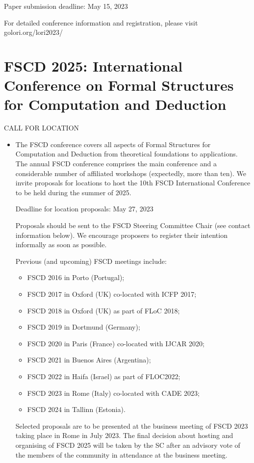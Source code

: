\documentclass[prodmode,acmtecs]{acmsmall} %
\begin{document}
\begin{itemize}
Paper submission deadline: May 15, 2023 
 
  For detailed conference information and registration, please visit golori.org/lori2023/  
 
\end{itemize}\section{FSCD 2025: International Conference on Formal Structures for Computation and Deduction}\label{FSCD2025}CALL FOR LOCATION 

\begin{itemize}\item  The FSCD conference covers all aspects of Formal Structures for Computation and Deduction from theoretical foundations to applications.  The annual FSCD conference comprises the main conference and a considerable number of affiliated workshops (expectedly, more than ten). We invite proposals for locations to host the 10th FSCD International Conference to be held during the summer of 2025.  
 
Deadline for location proposals: May 27, 2023 
 
  Proposals should be sent to the FSCD Steering Committee Chair (see contact information below). We encourage proposers to register their intention informally as soon as possible. 
 
  Previous (and upcoming) FSCD meetings include: 
 
\begin{itemize}\item  FSCD 2016 in Porto (Portugal);
\item  FSCD 2017 in Oxford (UK) co-located with ICFP 2017;
\item  FSCD 2018 in Oxford (UK) as part of FLoC 2018;
\item  FSCD 2019 in Dortmund (Germany);
\item  FSCD 2020 in Paris (France) co-located with IJCAR 2020;
\item  FSCD 2021 in Buenos Aires (Argentina);
\item  FSCD 2022 in Haifa (Israel) as part of FLOC2022;
\item  FSCD 2023 in Rome (Italy) co-located with CADE 2023;
\item  FSCD 2024 in Tallinn (Estonia).
\end{itemize} 
  Selected proposals are to be presented at the business meeting of FSCD 2023 taking place in Rome in July 2023.  The final decision about hosting and organising of FSCD 2025 will be taken by the SC after an advisory vote of the members of the community in attendance at the business meeting. 
 

\end{itemize}
\end{document}
